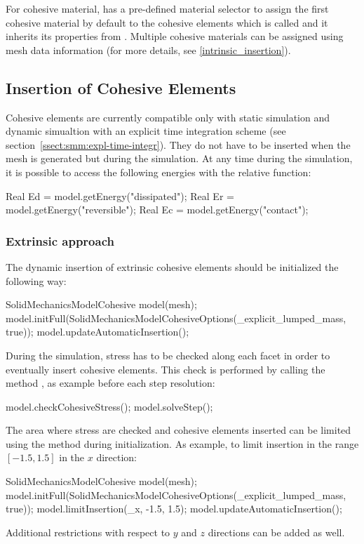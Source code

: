 For cohesive material, \akantu has a pre-defined material selector to assign 
the first cohesive material by default to the cohesive elements which is called 
 and it inherits its properties from 
. Multiple cohesive materials can be assigned 
using mesh data information (for more details, see \ref{intrinsic_insertion}).

\subsection{Insertion of Cohesive Elements}
Cohesive elements are currently compatible only with static simulation and dynamic simualtion with an explicit time integration scheme
(see section~\ref{ssect:smm:expl-time-integr}). They do not have to be
inserted when the mesh is generated but during the simulation. At any time during the simulation, it is possible to access the following energies with the relative function:
\begin{cpp}
  Real Ed = model.getEnergy("dissipated");
  Real Er = model.getEnergy("reversible");
  Real Ec = model.getEnergy("contact");
\end{cpp}

\subsubsection{Extrinsic approach}
The dynamic insertion of extrinsic cohesive elements should be initialized 
the following way:
\begin{cpp}
  SolidMechanicsModelCohesive model(mesh);
  model.initFull(SolidMechanicsModelCohesiveOptions(_explicit_lumped_mass, true));
  model.updateAutomaticInsertion();
\end{cpp} 
During the simulation, stress has to be checked along each facet in order to 
eventually insert cohesive elements.
This check is performed by calling the method , as 
example before each step resolution:
\begin{cpp}
  model.checkCohesiveStress();
  model.solveStep();
\end{cpp}
The area where stress are checked and cohesive elements inserted can be limited 
using the method  during initialization. As example, to 
limit insertion in the range $[-1.5, 1.5]$ in the $x$ direction: 
\begin{cpp}
  SolidMechanicsModelCohesive model(mesh);
  model.initFull(SolidMechanicsModelCohesiveOptions(_explicit_lumped_mass, true));
  model.limitInsertion(_x, -1.5, 1.5);
  model.updateAutomaticInsertion();
\end{cpp} 
Additional restrictions with respect to $y$ and $z$ directions can be added as well.

